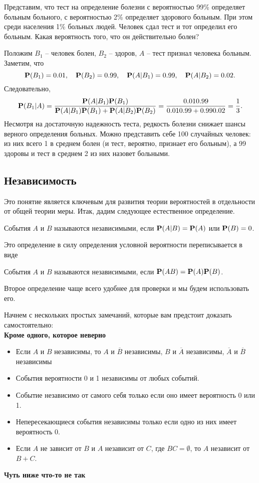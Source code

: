 \documentclass[11 pt,russian]{article}
\begin{document}
\begin{Exam}
Представим, что тест на определение болезни с вероятностью 99\% определяет больным больного, с вероятностью 2\% определяет здорового больным. При этом среди населения 1\% больных людей. Человек сдал тест и тот определил его больным. Какая вероятность того, что он действительно болен?

Положим $B_1$ -- человек болен, $B_2$ -- здоров, $A$ -- тест признал человека больным. Заметим, что
$$
{\bf P}(B_1) = 0.01,\quad
{\bf P}(B_2) = 0.99, \quad
{\bf P}(A|B_1) = 0.99,\quad
{\bf P}(A|B_2) = 0.02.
$$
Следовательно,
$$
{\bf P}(B_1|A) = \frac{{\bf P}(A|B_1) {\bf P}(B_1)}{{\bf P}(A|B_1) {\bf P}(B_1) + {\bf P}(A|B_2) {\bf P}(B_2)} = \frac{0.01 0.99}{0.01 0.99 + 0.99 0.02} = \frac{1}{3}.
$$
Несмотря на достаточную надежность теста, редкость болезни снижает шансы верного определения больных. Можно представить себе 100 случайных человек: из них всего 1 в среднем болен (и тест, вероятно, признает его больным), а 99 здоровы и тест в среднем 2 из них назовет больными.
\end{Exam}
\subsection{Независимость}
Это понятие является ключевым для развития теории вероятностей в отдельности от общей теории меры. Итак, дадим следующее естественное определение.
\begin{Def}
События $A$ и $B$ называются независимыми, если ${\bf P}(A|B) = {\bf P}(A)$ или ${\bf P}(B)=0$.
\end{Def}
Это определение в силу определения условной вероятности переписывается в виде
\begin{Def}
События $A$ и $B$ называются независимыми, если ${\bf P}(AB) = {\bf P}(A) {\bf P}(B)$.
\end{Def}
Второе определение чаще всего удобнее для проверки и мы будем использовать его.

Начнем с нескольких простых замечаний, которые вам предстоит доказать самостоятельно:\\
{\bf Кроме одного, которое неверно}
\begin{itemize}
\item Если $A$ и $B$ независимы, то $A$ и $\overline{B}$ независимы, $B$ и $\overline{A}$ независимы, $\overline{A}$ и $\overline{B}$ независимы
\item События вероятности 0 и 1 независимы от любых событий.
\item Событие независимо от самого себя только если оно имеет вероятность 0 или 1.
\item Непересекающиеся события независимы только если одно из них имеет вероятность 0.
\item Если $A$ не зависит от $B$ и $A$ независит от $C$, где $BC=\emptyset$, то $A$ независит от $B+C$.
\end{itemize}
{\bf Чуть ниже что-то не так}
\end{document}
